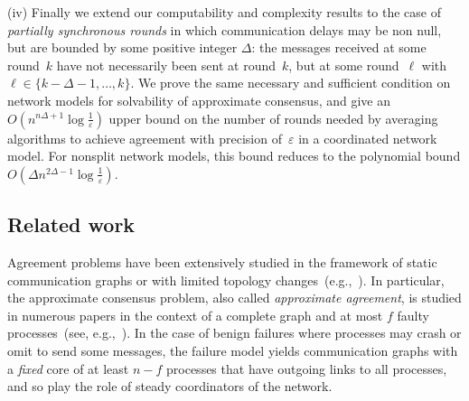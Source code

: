 \documentclass[a4paper]{article}
\theoremstyle{newthm}
\begin{document}
(iv) Finally we extend our computability and complexity results to the case of {\em partially synchronous rounds}
	in which communication delays may be non null, but are bounded by some positive
	integer $\Delta$: the messages  received at some round~$k$  have not necessarily been sent at round~$k$,
	but  at some round~$\ell$ with $\ell \in \{k-\Delta-1, \dots , k \}$.
We prove  the same necessary and sufficient condition on network models  for 
	solvability of approximate consensus, and  give an $O \left ( n ^{n\Delta  + 1} \log \frac{1}{\varepsilon} \right )$ 
	upper bound on the number of rounds needed by averaging algorithms to achieve agreement with precision of~$\varepsilon$ 
	in a coordinated network model.
For nonsplit network models, this bound reduces to the polynomial bound $O \left ( \Delta n^{2\Delta  -1 }  \log \frac{1}{\varepsilon}  \right )$.
	
	
\subsection{Related work}

Agreement problems have been extensively studied in the framework of static
	communication graphs or with limited topology 
	changes~(e.g.,~\cite{Lyn96,AW05, PBE07,Vai14}).
In particular, the approximate consensus problem, also called {\em approximate
	agreement}, is studied in numerous papers in the context of a complete 
	graph and at most $f$ faulty processes~(see, e.g.,~\cite{DLPSW86, Fek90,ALS94}).
In the case of benign failures where processes may crash or  omit to send some messages,
	the failure model yields communication graphs with a {\em fixed} core of at least $n-f$ processes
	that have outgoing links to all processes, and so play the role of
	steady coordinators of  the network.
\end{document}
